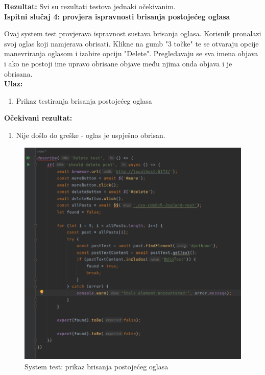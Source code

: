 			\textbf{Rezultat:}
			Svi su rezultati testova jednaki očekivanim.\\
			
			\textbf{Ispitni slučaj 4: provjera ispravnosti brisanja postojećeg oglasa}
			
			Ovaj system test provjerava ispravnost sustava brisanja oglasa. Korisnik pronalazi svoj oglas koji namjerava obrisati. Klikne na gumb "3 točke" te se otvaraju opcije manevriranja oglasom i izabire opciju "Delete". Pregledavaju se sva imena objava i ako ne postoji ime upravo obrisane objave među njima onda objava i je obrisana. \\
			
			\textbf{Ulaz:}
			
				\begin{enumerate}
					\item Prikaz testiranja brisanja postojećeg oglasa
				\end{enumerate}
				
			\textbf{Očekivani rezultat:}
			
				\begin{enumerate}
					\item Nije došlo do greške - oglas je uspješno obrisan.
				\end{enumerate}
			
			\begin{figure}[H]
				\includegraphics[scale=0.7]{slike/sysdeletepost.PNG} 
				\centering
				\caption{System test: prikaz brisanja postojećeg oglasa}
				\label{sysdeletepost}
			\end{figure}
			
